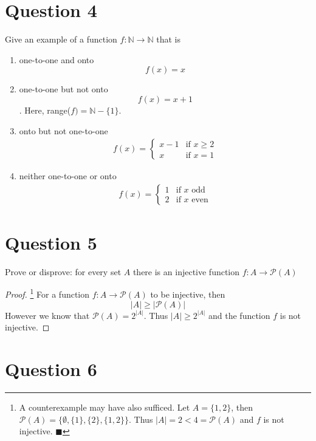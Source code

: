 \documentclass[11pt, oneside]{article}   	%
\newcommand*{\QEDA}{\hfill\ensuremath{\blacksquare}}         %
\newcommand{\N}{\mathbb N}
\begin{document}
\section*{Question 4}

Give an example of a function $f : \N \to \N$ that is
\begin{enumerate}[\quad(a)]
	\item one-to-one and onto
	$$f(x) = x$$
	\item one-to-one but not onto
	$$f(x)=x+1$$.
	Here, range($f)=\N-\{1\}.$
	\item onto but not one-to-one
	\begin{align*}
		f(x) = \begin{cases}
				x-1 & \text{if } x \geq 2 \\
				x & \text{if } x = 1
			\end{cases}
	\end{align*}
	\item neither one-to-one or onto
	\begin{align*}
		f(x) = \begin{cases}
				1 & \text{if } x \text{ odd} \\
				2 & \text{if } x \text{ even}
			\end{cases}
	\end{align*}
\end{enumerate}


\section*{Question 5}

Prove or disprove: for every set $A$ there is an injective function $f : A \to \mathcal{P}(A)$
\begin{proof}\footnote{A counterexample may have also sufficed. Let $A=\{1,2\}$, then $\mathcal{P}(A) = \{\emptyset, \{1\}, \{2\}, \{1,2\}\}$. Thus $|A| = 2 < 4 = \mathcal{P}(A)$ and $f$ is not injective. \QEDA}
For a function $f : A \to \mathcal{P}(A)$ to be injective, then
$$|A| \geq |\mathcal{P}(A)|$$
However we know that $\mathcal{P}(A) = 2^{|A|}$. Thus $|A| \geq 2^{|A|}$ and the function $f$ is not injective.
\end{proof}



\section*{Question 6}
\end{document}
